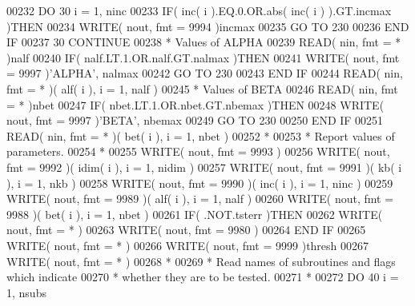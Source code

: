 \begin{DoxyCode}
00232       \textcolor{keywordflow}{DO} 30 i = 1, ninc
00233          \textcolor{keywordflow}{IF}( inc( i ).EQ.0.OR.abs( inc( i ) ).GT.incmax )\textcolor{keywordflow}{THEN}
00234             \textcolor{keyword}{WRITE}( nout, fmt = 9994 )incmax
00235             \textcolor{keywordflow}{GO TO} 230
00236 \textcolor{keywordflow}{         END IF}
00237    30 \textcolor{keywordflow}{CONTINUE}
00238 \textcolor{comment}{*     Values of ALPHA}
00239       \textcolor{keyword}{READ}( nin, fmt = * )nalf
00240       \textcolor{keywordflow}{IF}( nalf.LT.1.OR.nalf.GT.nalmax )\textcolor{keywordflow}{THEN}
00241          \textcolor{keyword}{WRITE}( nout, fmt = 9997 )\textcolor{stringliteral}{'ALPHA'}, nalmax
00242          \textcolor{keywordflow}{GO TO} 230
00243 \textcolor{keywordflow}{      END IF}
00244       \textcolor{keyword}{READ}( nin, fmt = * )( alf( i ), i = 1, nalf )
00245 \textcolor{comment}{*     Values of BETA}
00246       \textcolor{keyword}{READ}( nin, fmt = * )nbet
00247       \textcolor{keywordflow}{IF}( nbet.LT.1.OR.nbet.GT.nbemax )\textcolor{keywordflow}{THEN}
00248          \textcolor{keyword}{WRITE}( nout, fmt = 9997 )\textcolor{stringliteral}{'BETA'}, nbemax
00249          \textcolor{keywordflow}{GO TO} 230
00250 \textcolor{keywordflow}{      END IF}
00251       \textcolor{keyword}{READ}( nin, fmt = * )( bet( i ), i = 1, nbet )
00252 \textcolor{comment}{*}
00253 \textcolor{comment}{*     Report values of parameters.}
00254 \textcolor{comment}{*}
00255       \textcolor{keyword}{WRITE}( nout, fmt = 9993 )
00256       \textcolor{keyword}{WRITE}( nout, fmt = 9992 )( idim( i ), i = 1, nidim )
00257       \textcolor{keyword}{WRITE}( nout, fmt = 9991 )( kb( i ), i = 1, nkb )
00258       \textcolor{keyword}{WRITE}( nout, fmt = 9990 )( inc( i ), i = 1, ninc )
00259       \textcolor{keyword}{WRITE}( nout, fmt = 9989 )( alf( i ), i = 1, nalf )
00260       \textcolor{keyword}{WRITE}( nout, fmt = 9988 )( bet( i ), i = 1, nbet )
00261       \textcolor{keywordflow}{IF}( .NOT.tsterr )\textcolor{keywordflow}{THEN}
00262          \textcolor{keyword}{WRITE}( nout, fmt = * )
00263          \textcolor{keyword}{WRITE}( nout, fmt = 9980 )
00264 \textcolor{keywordflow}{      END IF}
00265       \textcolor{keyword}{WRITE}( nout, fmt = * )
00266       \textcolor{keyword}{WRITE}( nout, fmt = 9999 )thresh
00267       \textcolor{keyword}{WRITE}( nout, fmt = * )
00268 \textcolor{comment}{*}
00269 \textcolor{comment}{*     Read names of subroutines and flags which indicate}
00270 \textcolor{comment}{*     whether they are to be tested.}
00271 \textcolor{comment}{*}
00272       \textcolor{keywordflow}{DO} 40 i = 1, nsubs

\end{DoxyCode}
